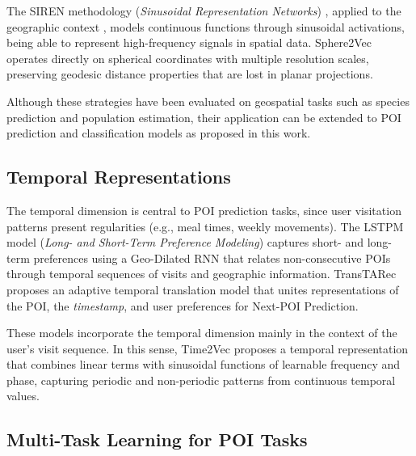 The SIREN methodology (\textit{Sinusoidal Representation Networks}) \cite{sitzmann2020implicit}, applied to the geographic context \cite{rußwurm2024geographiclocationencodingspherical}, models continuous functions through sinusoidal activations, being able to represent high-frequency signals in spatial data. Sphere2Vec \cite{mai2023sphere2vecgeneralpurposelocationrepresentation} operates directly on spherical coordinates with multiple resolution scales, preserving geodesic distance properties that are lost in planar projections.

Although these strategies have been evaluated on geospatial tasks such as species prediction and population estimation, their application can be extended to POI prediction and classification models as proposed in this work.

\subsection{Temporal Representations}

The temporal dimension is central to POI prediction tasks, since user visitation patterns present regularities (e.g., meal times, weekly movements). The LSTPM model (\textit{Long- and Short-Term Preference Modeling}) \cite{sun2020go} captures short- and long-term preferences using a Geo-Dilated RNN that relates non-consecutive POIs through temporal sequences of visits and geographic information. TransTARec \cite{sun2024transtarec} proposes an adaptive temporal translation model that unites representations of the POI, the \textit{timestamp}, and user preferences for Next-POI Prediction.

These models incorporate the temporal dimension mainly in the context of the user's visit sequence. In this sense, Time2Vec \cite{kazemi2019time2vec} proposes a temporal representation that combines linear terms with sinusoidal functions of learnable frequency and phase, capturing periodic and non-periodic patterns from continuous temporal values.

\subsection{Multi-Task Learning for POI Tasks}

